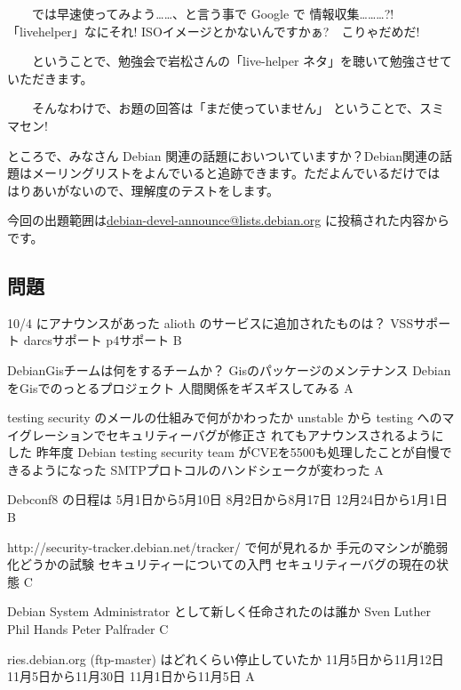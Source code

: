 \documentclass[mingoth,a4paper]{jsarticle}
\begin{document}
　　では早速使ってみよう……、と言う事で Google で
情報収集………?!　「livehelper」なにそれ!
ISOイメージとかないんですかぁ?　こりゃだめだ!

　　ということで、勉強会で岩松さんの「live-helper
ネタ」を聴いて勉強させていただきます。

　　そんなわけで、お題の回答は「まだ使っていません」
ということで、スミマセン!


ところで、みなさん Debian 関連の話題においついていますか？Debian関連の話
題はメーリングリストをよんでいると追跡できます。ただよんでいるだけでは
はりあいがないので、理解度のテストをします。

今回の出題範囲は\url{debian-devel-announce@lists.debian.org} に投稿された内容からです。
\begin{multicols}{2}
 
 \subsection{問題}

 \santaku
 {10/4 にアナウンスがあった alioth のサービスに追加されたものは？}
 {VSSサポート}
 {darcsサポート}
 {p4サポート}
 {B}
{}

 \santaku
 {DebianGisチームは何をするチームか？}
 {Gisのパッケージのメンテナンス}
 {DebianをGisでのっとるプロジェクト}
 {人間関係をギスギスしてみる}
 {A}
{}

 \santaku
 {testing security のメールの仕組みで何がかわったか}
 {unstable から testing へのマイグレーションでセキュリティーバグが修正さ
 れてもアナウンスされるようにした}
 {昨年度 Debian testing security team がCVEを5500も処理したことが自慢できるようになった}
 {SMTPプロトコルのハンドシェークが変わった}
 {A}
{}

 \santaku
 {Debconf8 の日程は}
 {5月1日から5月10日}
 {8月2日から8月17日}
 {12月24日から1月1日}
 {B}
{}

 \santaku
 {http://security-tracker.debian.net/tracker/ で何が見れるか}
 {手元のマシンが脆弱化どうかの試験}
 {セキュリティーについての入門}
 {セキュリティーバグの現在の状態}
 {C}
{}

 \santaku
 {Debian System Administrator として新しく任命されたのは誰か}
 {Sven Luther}
 {Phil Hands}
 {Peter Palfrader}
 {C}
{}

 \santaku
 {ries.debian.org (ftp-master) はどれくらい停止していたか}
 {11月5日から11月12日}
 {11月5日から11月30日}
 {11月1日から11月5日}
 {A}
{}
\end{multicols}
\end{document}
